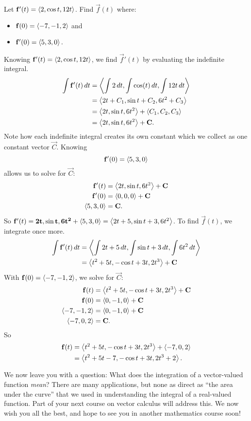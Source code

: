 \documentclass{ximera}
\begin{document}
\begin{example}
  Let $\mathbf{f}'(t) = \left\langle 2, \cos t, 12t\right\rangle$. Find $\vec f(t)$ where:
  \begin{itemize}
  \item $\mathbf f(0) = \left\langle -7,-1,2\right\rangle$ and
  \item $\mathbf{f}'(0) = \left\langle 5,3,0\right\rangle.$
  \end{itemize}
  \begin{explanation}
    Knowing $\mathbf{f}'(t) = \left\langle 2,\cos t, 12t\right\rangle$, we find
    $\vec{f}'(t)$ by evaluating the indefinite integral.
    \begin{align*}
      \int \mathbf{f}'(t)\mathop{}\!d t &= \left\langle \int 2\mathop{}\!d t, \int \cos(t)\mathop{}\!d t , \int 12t\mathop{}\!d t\right\rangle \\
      &= \left\langle 2t+C_1, \sin t+ C_2, 6t^2 + C_3\right\rangle \\
      &= \left\langle 2t,\sin t,6t^2\right\rangle + \left\langle C_1,C_2,C_3\right\rangle \\
      &= \left\langle 2t,\sin t,6t^2\right\rangle + \mathbf{C}.
    \end{align*}
    Note how each indefinite integral creates its own constant which
    we collect as one constant vector $\vec C$. Knowing
    \[
    \mathbf{f}'(0) = \left\langle 5,3,0\right\rangle
    \]
    allows us to solve for $\vec C$:
    \begin{align*}
      \mathbf{f}'(t) & = \left\langle 2t,\sin t,6t^2\right\rangle + \mathbf C\\
      \mathbf{f}'(0) &= \left\langle 0,0,0\right\rangle + \mathbf C\\
      \left\langle 5,3,0\right\rangle &= \mathbf C.
    \end{align*}
    So $\mathbf{f}'(t) = \mathbf{2t,\sin t,6t^2} + \left\langle 5,3,0\right\rangle =
    \left\langle 2t+5, \sin t + 3, 6t^2\right\rangle$. To find $\vec f(t)$, we
    integrate once more.
    \begin{align*}
      \int \mathbf{f}'(t)\mathop{}\!d t &= \left\langle \int 2t+5\mathop{}\!d t, \int \sin t + 3\mathop{}\!d t, \int 6t^2\mathop{}\!d t \right\rangle\\
      &= \left\langle t^2+5t, -\cos t + 3t, 2t^3\right\rangle + \mathbf C
    \end{align*}
    With $\mathbf f(0) = \left\langle -7,-1,2\right\rangle$, we solve for $\vec C$:
    \begin{align*}
      \mathbf f(t) &= \left\langle t^2+5t, -\cos t + 3t, 2t^3\right\rangle + \mathbf C\\
      \mathbf f(0) &= \left\langle 0,-1,0\right\rangle + \mathbf C\\
      \left\langle -7,-1,2\right\rangle &= \left\langle 0,-1,0\right\rangle + \mathbf C\\
      \left\langle -7,0,2\right\rangle &= \mathbf C.
    \end{align*}
    So
    \begin{align*}
      \mathbf f(t) &= \left\langle t^2+5t, -\cos t + 3t, 2t^3\right\rangle + \left\langle -7,0,2\right\rangle\\
      &= \left\langle t^2+5t-7,-\cos t+3t,2t^3+2\right\rangle.
    \end{align*}
  \end{explanation}
\end{example}

We now leave you with a question: What does the integration of a
vector-valued function \textit{mean}?  There are many applications,
but none as direct as ``the area under the curve'' that we used in
understanding the integral of a real-valued function. Part of your
next course on vector calculus will address this. We now wish you all
the best, and hope to see you in another mathematics course soon!
\end{document}
